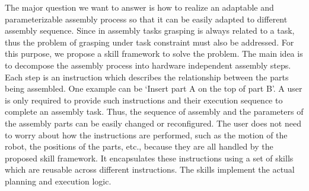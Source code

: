 
The major question we want to answer is how to realize an adaptable and parameterizable assembly process so that it can be easily adapted to different assembly sequence. Since in assembly tasks grasping is always related to a task, thus the problem of grasping under task constraint must also be addressed. For this purpose, we propose a skill framework to solve the problem. The main idea is to decompose the assembly process into hardware independent assembly steps. Each step is an instruction which describes the relationship between the parts being assembled. One example can be `Insert part A on the top of part B'. A user is only required to provide such instructions and their execution sequence to complete an assembly task. Thus, the sequence of assembly and the parameters of the assembly parts can be easily changed or reconfigured. The user does not need to worry about how the instructions are performed, such as the motion of the robot, the positions of the parts, etc., because they are all handled by the proposed skill framework. It encapsulates these instructions using a set of skills which are reusable across different instructions. The skills implement the actual planning and execution logic. 

